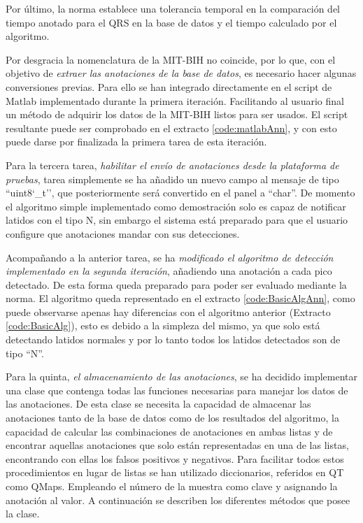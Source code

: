     Por último, la norma establece una tolerancia temporal en la comparación del tiempo anotado para el QRS en la base de datos y el tiempo calculado por el algoritmo. 
        
    Por desgracia la nomenclatura de la MIT-BIH no coincide, por lo que, con el objetivo de \textit{extraer las anotaciones de la base de datos}, es necesario hacer algunas conversiones previas. Para ello se han integrado directamente en el script de Matlab implementado durante la primera iteración. Facilitando al usuario final un método de adquirir los datos de la MIT-BIH listos para ser usados. El script resultante puede ser comprobado en el extracto \ref{code:matlabAnn}, y con esto puede darse por finalizada la primera tarea de esta iteración.
        
        
    Para la tercera tarea, \textit{habilitar el envío de anotaciones desde la plataforma de pruebas}, tarea simplemente se ha añadido un nuevo campo al mensaje de tipo ``uint8\char`_t'', que posteriormente será convertido en el panel a ``char''. De momento el algoritmo simple implementado como demostración solo es capaz de notificar latidos con el tipo N, sin embargo el sistema está preparado para que el usuario configure que anotaciones mandar con sus detecciones.
    
    Acompañando a la anterior tarea, se ha \textit{modificado el algoritmo de detección implementado en la segunda iteración}, añadiendo una anotación a cada pico detectado. De esta forma queda preparado para poder ser evaluado mediante la norma. El algoritmo queda representado en el extracto \ref{code:BasicAlgAnn}, como puede observarse apenas hay diferencias con el algoritmo anterior (Extracto \ref{code:BasicAlg}), esto es debido a la simpleza del mismo, ya que solo está detectando latidos normales y por lo tanto todos los latidos detectados son de tipo ``N''.
    
        
    Para la quinta, \textit{el almacenamiento de las anotaciones}, se ha decidido implementar una clase que contenga todas las funciones necesarias para manejar los datos de las anotaciones. De esta clase se necesita la capacidad de almacenar las anotaciones tanto de la base de datos como de los resultados del algoritmo, la capacidad de calcular las combinaciones de anotaciones en ambas listas y de encontrar aquellas anotaciones que solo están representadas en una de las listas, encontrando con ellas los falsos positivos y negativos. Para facilitar todos estos procedimientos en lugar de listas se han utilizado diccionarios, referidos en QT como QMaps. Empleando el número de la muestra como clave y asignando la anotación al valor. A continuación se describen los diferentes métodos que posee la clase.
        
